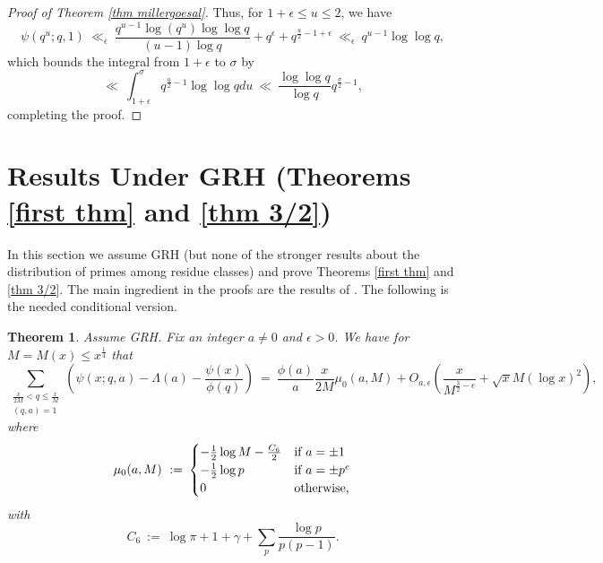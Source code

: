 \documentclass[12pt,reqno]{amsart}
\numberwithin{equation}{section}
\theoremstyle{plain}
\newtheorem{theorem}[thm]{Theorem}
\begin{document}
\begin{proof}[Proof of Theorem \ref{thm millergoesal}]
Thus, for $1+\epsilon \leq u\leq 2$, we have
\begin{equation} \psi(q^u;q,1)\ \ll_{\epsilon}\ \frac{q^{u-1} \log (q^u)\log\log q}{(u-1)\log q}+ q^{\epsilon}+q^{\frac u2-1+\epsilon}\ \ll_{\epsilon}\ q^{u-1} \log\log q,\end{equation}
which bounds the integral from $1+\epsilon$ to $\sigma$ by
\begin{equation} \ll\ \int_{1+\epsilon}^{\sigma} q^{\frac u2-1}\log\log q du\ \ll\ \frac{\log\log q}{\log q}q^{\frac{\sigma}2-1},\end{equation}
completing the proof.
\end{proof}

\section{Results Under GRH (Theorems \ref{first thm} and \ref{thm 3/2})}\label{sec:proofthm32}

In this section we assume GRH (but none of the stronger results about the distribution of primes among residue classes) and prove Theorems \ref{first thm} and \ref{thm 3/2}. The main ingredient in the proofs are the results of \cite{fouvry, BFI, FG, fiorilli}. The following is the needed conditional version.

\begin{theorem}\label{thm fiorilli} Assume GRH. Fix an integer $a\neq 0$ and $\epsilon>0$. We have for $M=M(x)\leq x^{\frac 14}$ that
\begin{equation}   \sum_{\substack{\frac x{2M}<q\leq \frac x{M} \\ (q,a)=1}} \left( \psi(x;q,a)-\Lambda(a)-\frac {\psi(x)}{\phi(q)}\right)\ =\ \frac{\phi(a)}{a}\frac{x}{2M} \mu_0(a,M) +O_{a,\epsilon} \left(\frac{x}{M^{\frac{3}{2}-\epsilon}}+\sqrt x M (\log x)^2 \right), \end{equation}
where
\begin{equation} {{\mu_0(a,M) \ := \ } \begin{cases} {-\frac 12 \log M-\frac{C_6}2} & \text{{\rm {if $a=\pm 1$}}}\\ {-\frac 12 \log p}
&\text{{\rm {if $a=\pm p^e$}}}\\ {0} & \texttt{{\rm {otherwise,}}} \end{cases}   }
\end{equation}
with
\begin{equation} C_6 \ :=\ \log \pi +1+ \gamma + \sum_p \frac{\log p}{p(p-1)}.\end{equation}
\end{theorem}
\end{document}
